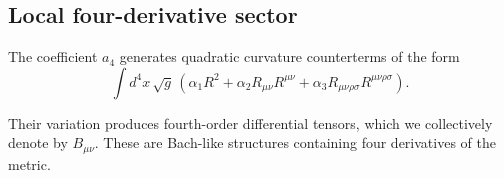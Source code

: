 \subsection{Local four-derivative sector}
  \label{subsec:four-derivative}

  The coefficient $a_4$ generates quadratic curvature counterterms of the form
  \begin{equation}
    \int d^4x\,\sqrt{g}\,
    \left(
      \alpha_1 R^2
    +
      \alpha_2 R_{\mu\nu}R^{\mu\nu}
      +
      \alpha_3 R_{\mu\nu\rho\sigma}R^{\mu\nu\rho\sigma}
    \right).
  \end{equation}

  Their variation produces fourth-order differential tensors,
  which we collectively denote by $B_{\mu\nu}$.
  These are Bach-like structures containing four derivatives of the metric.
